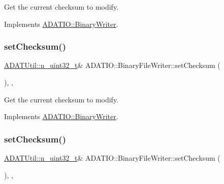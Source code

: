 Get the current checksum to modify. 



Implements \mbox{\hyperlink{classADATIO_1_1BinaryWriter_ae64230370824192d1f0dbcaa8e74017a}{A\+D\+A\+T\+I\+O\+::\+Binary\+Writer}}.

\mbox{\label{classADATIO_1_1BinaryFileWriter_a0137ec5926d08e49ed7a63c6ef33e882}} 
\subsubsection{\texorpdfstring{setChecksum()}{setChecksum()}\hspace{0.1cm}{\footnotesize\ttfamily [2/3]}}
{\footnotesize\ttfamily \mbox{\hyperlink{namespaceADATUtil_ad945a8afa4db2d1f89b731964adae97e}{A\+D\+A\+T\+Util\+::n\+\_\+uint32\+\_\+t}}\& A\+D\+A\+T\+I\+O\+::\+Binary\+File\+Writer\+::set\+Checksum (\begin{DoxyParamCaption}{ }\end{DoxyParamCaption})\hspace{0.3cm}{\ttfamily [inline]}, {\ttfamily [protected]}, {\ttfamily [virtual]}}



Get the current checksum to modify. 



Implements \mbox{\hyperlink{classADATIO_1_1BinaryWriter_ae64230370824192d1f0dbcaa8e74017a}{A\+D\+A\+T\+I\+O\+::\+Binary\+Writer}}.

\mbox{\label{classADATIO_1_1BinaryFileWriter_a0137ec5926d08e49ed7a63c6ef33e882}} 
\subsubsection{\texorpdfstring{setChecksum()}{setChecksum()}\hspace{0.1cm}{\footnotesize\ttfamily [3/3]}}
{\footnotesize\ttfamily \mbox{\hyperlink{namespaceADATUtil_ad945a8afa4db2d1f89b731964adae97e}{A\+D\+A\+T\+Util\+::n\+\_\+uint32\+\_\+t}}\& A\+D\+A\+T\+I\+O\+::\+Binary\+File\+Writer\+::set\+Checksum (\begin{DoxyParamCaption}{ }\end{DoxyParamCaption})\hspace{0.3cm}{\ttfamily [inline]}, {\ttfamily [protected]}, {\ttfamily [virtual]}}



